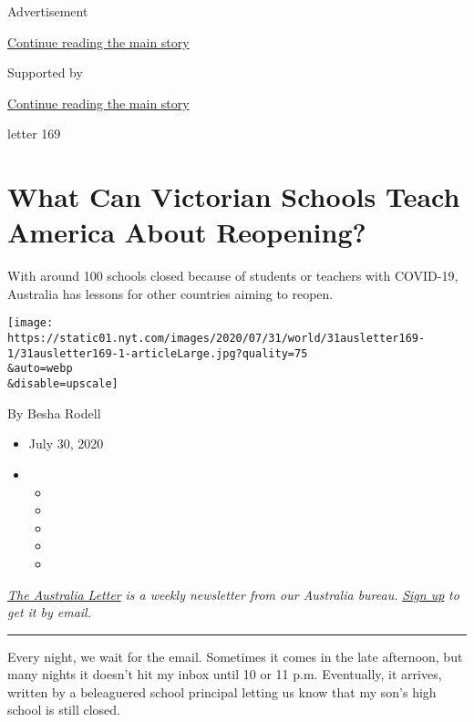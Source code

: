 Advertisement

\protect\hyperlink{after-top}{Continue reading the main story}

Supported by

\protect\hyperlink{after-sponsor}{Continue reading the main story}

letter 169

\hypertarget{what-can-victorian-schools-teach-america-about-reopening}{%
\section{What Can Victorian Schools Teach America About
Reopening?}\label{what-can-victorian-schools-teach-america-about-reopening}}

With around 100 schools closed because of students or teachers with
COVID-19, Australia has lessons for other countries aiming to reopen.

\texttt{[image: https://static01.nyt.com/images/2020/07/31/world/31ausletter169-1/31ausletter169-1-articleLarge.jpg?quality=75\\\&auto=webp\\\&disable=upscale]}

By Besha Rodell

\begin{itemize}
\item
  July 30, 2020
\item
  \begin{itemize}
  \item
  \item
  \item
  \item
  \item
  \end{itemize}
\end{itemize}

\href{https://www.nytimes.com/series/nyt-australia-newsletter?module=inline}{\emph{The
Australia Letter}} \emph{is a weekly newsletter from our Australia
bureau.}
\href{https://www.nytimes.com/newsletters/australia-letter?module=inline}{\emph{Sign
up}} \emph{to get it by email.}

\begin{center}\rule{0.5\linewidth}{\linethickness}\end{center}

Every night, we wait for the email. Sometimes it comes in the late
afternoon, but many nights it doesn't hit my inbox until 10 or 11 p.m.
Eventually, it arrives, written by a beleaguered school principal
letting us know that my son's high school is still closed.

